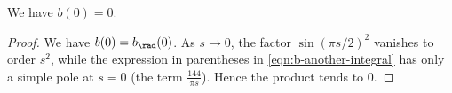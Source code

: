 \begin{proposition}\label{prop:b0}\leanok
We have $b(0) = 0$.
\end{proposition}
\begin{proof}
We have $b(0) = b_\rad(0)$. As $s \to 0$, the factor $\sin(\pi s/2)^2$ vanishes to order $s^2$, while the expression in parentheses in \eqref{eqn:b-another-integral} has only a simple pole at $s = 0$ (the term $\frac{144}{\pi s}$). Hence the product tends to $0$.
\end{proof}
